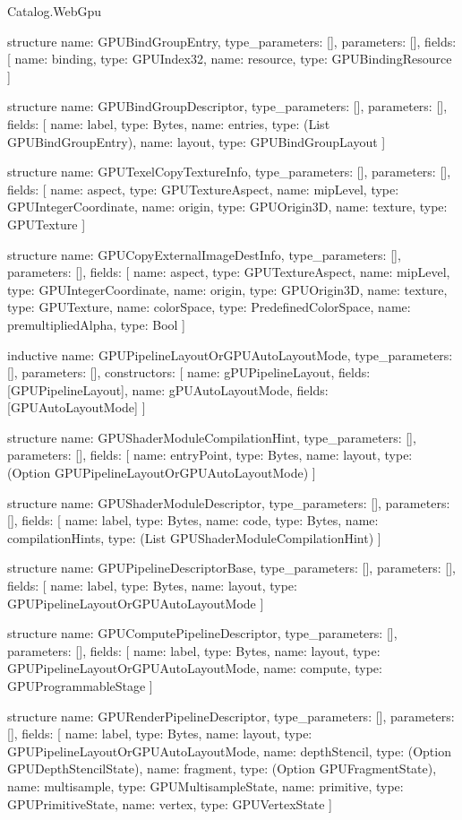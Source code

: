\begin{lexlean}{Catalog.WebGpu}
\begin{semanticmodule}
structure{
  name: GPUBindGroupEntry,
  type_parameters: [],
  parameters: [],
  fields: [
    {name: binding, type: GPUIndex32},
    {name: resource, type: GPUBindingResource}
  ]
}

structure{
  name: GPUBindGroupDescriptor,
  type_parameters: [],
  parameters: [],
  fields: [
    {name: label, type: Bytes},
    {name: entries, type: (List GPUBindGroupEntry)},
    {name: layout, type: GPUBindGroupLayout}
  ]
}

structure{
  name: GPUTexelCopyTextureInfo,
  type_parameters: [],
  parameters: [],
  fields: [
    {name: aspect, type: GPUTextureAspect},
    {name: mipLevel, type: GPUIntegerCoordinate},
    {name: origin, type: GPUOrigin3D},
    {name: texture, type: GPUTexture}
  ]
}

structure{
  name: GPUCopyExternalImageDestInfo,
  type_parameters: [],
  parameters: [],
  fields: [
    {name: aspect, type: GPUTextureAspect},
    {name: mipLevel, type: GPUIntegerCoordinate},
    {name: origin, type: GPUOrigin3D},
    {name: texture, type: GPUTexture},
    {name: colorSpace, type: PredefinedColorSpace},
    {name: premultipliedAlpha, type: Bool}
  ]
}

inductive{
  name: GPUPipelineLayoutOrGPUAutoLayoutMode,
  type_parameters: [],
  parameters: [],
  constructors: [
    {name: gPUPipelineLayout, fields: [GPUPipelineLayout]},
    {name: gPUAutoLayoutMode, fields: [GPUAutoLayoutMode]}
  ]
}

structure{
  name: GPUShaderModuleCompilationHint,
  type_parameters: [],
  parameters: [],
  fields: [
    {name: entryPoint, type: Bytes},
    {name: layout, type: (Option GPUPipelineLayoutOrGPUAutoLayoutMode)}
  ]
}

structure{
  name: GPUShaderModuleDescriptor,
  type_parameters: [],
  parameters: [],
  fields: [
    {name: label, type: Bytes},
    {name: code, type: Bytes},
    {name: compilationHints, type: (List GPUShaderModuleCompilationHint)}
  ]
}

structure{
  name: GPUPipelineDescriptorBase,
  type_parameters: [],
  parameters: [],
  fields: [
    {name: label, type: Bytes},
    {name: layout, type: GPUPipelineLayoutOrGPUAutoLayoutMode}
  ]
}

structure{
  name: GPUComputePipelineDescriptor,
  type_parameters: [],
  parameters: [],
  fields: [
    {name: label, type: Bytes},
    {name: layout, type: GPUPipelineLayoutOrGPUAutoLayoutMode},
    {name: compute, type: GPUProgrammableStage}
  ]
}

structure{
  name: GPURenderPipelineDescriptor,
  type_parameters: [],
  parameters: [],
  fields: [
    {name: label, type: Bytes},
    {name: layout, type: GPUPipelineLayoutOrGPUAutoLayoutMode},
    {name: depthStencil, type: (Option GPUDepthStencilState)},
    {name: fragment, type: (Option GPUFragmentState)},
    {name: multisample, type: GPUMultisampleState},
    {name: primitive, type: GPUPrimitiveState},
    {name: vertex, type: GPUVertexState}
  ]
}


\end{semanticmodule}
\end{lexlean}

